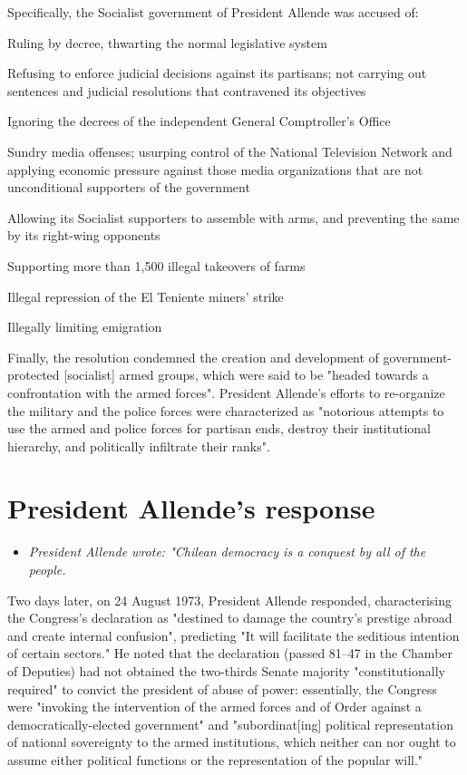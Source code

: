 Specifically, the Socialist government of President Allende was accused
of:

Ruling by decree, thwarting the normal legislative system

Refusing to enforce judicial decisions against its partisans; not
carrying out sentences and judicial resolutions that contravened its
objectives

Ignoring the decrees of the independent General Comptroller's Office

Sundry media offenses; usurping control of the National Television
Network and applying economic pressure against those media organizations
that are not unconditional supporters of the government

Allowing its Socialist supporters to assemble with arms, and preventing
the same by its right-wing opponents

Supporting more than 1,500 illegal takeovers of farms

Illegal repression of the El Teniente miners' strike

Illegally limiting emigration

Finally, the resolution condemned the creation and development of
government-protected {[}socialist{]} armed groups, which were said to be
"headed towards a confrontation with the armed forces". President
Allende's efforts to re-organize the military and the police forces were
characterized as "notorious attempts to use the armed and police forces
for partisan ends, destroy their institutional hierarchy, and
politically infiltrate their ranks".

\section{President Allende's
response}\label{president-allendes-response}

\begin{itemize}
\item
  \emph{President Allende wrote: "Chilean democracy is a conquest by all
  of the people.}
\end{itemize}

Two days later, on 24 August 1973, President Allende responded,
characterising the Congress's declaration as "destined to damage the
country's prestige abroad and create internal confusion", predicting "It
will facilitate the seditious intention of certain sectors." He noted
that the declaration (passed 81--47 in the Chamber of Deputies) had not
obtained the two-thirds Senate majority "constitutionally required" to
convict the president of abuse of power: essentially, the Congress were
"invoking the intervention of the armed forces and of Order against a
democratically-elected government" and "subordinat{[}ing{]} political
representation of national sovereignty to the armed institutions, which
neither can nor ought to assume either political functions or the
representation of the popular will."

